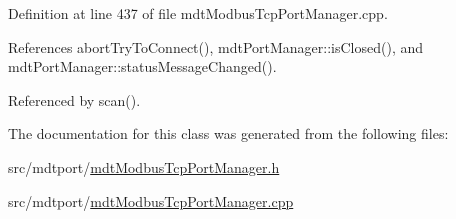 Definition at line 437 of file mdt\-Modbus\-Tcp\-Port\-Manager.\-cpp.



References abort\-Try\-To\-Connect(), mdt\-Port\-Manager\-::is\-Closed(), and mdt\-Port\-Manager\-::status\-Message\-Changed().



Referenced by scan().



The documentation for this class was generated from the following files\-:\begin{DoxyCompactItemize}
\item 
src/mdtport/\hyperlink{mdt_modbus_tcp_port_manager_8h}{mdt\-Modbus\-Tcp\-Port\-Manager.\-h}\item 
src/mdtport/\hyperlink{mdt_modbus_tcp_port_manager_8cpp}{mdt\-Modbus\-Tcp\-Port\-Manager.\-cpp}\end{DoxyCompactItemize}
